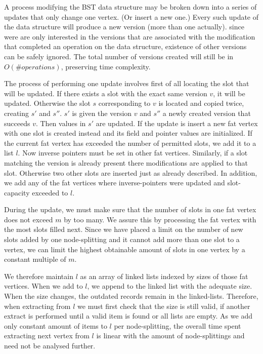 A process modifying the BST data structure may be broken down into a series of updates that only change one vertex. (Or insert a new one.)
Every such update of the data structure will produce a new version (more than one actually). since were are only interested in the versions that are associated with the modification that completed an operation on the data structure, existence of other versions can be safely ignored. The total number of versions created will still be in $O(\# operations)$, preserving time complexity.

The process of performing one update involves first of all locating the slot that will be updated. If there exists a slot with the exact same version $v$, it will be updated. Otherwise the slot $s$ corresponding to $v$ is located and copied twice, creating $s'$ and $s''$. $s'$ is given the version $v$ and $s''$ a newly created version that succeeds $v$. Then values in $s'$ are updated.
If the update is insert a new fat vertex with one slot is created instead and its field and pointer values are initialized.
If the current fat vertex has exceeded the number of permitted slots, we add it to a list $l$.
Now inverse pointers must be set in other fat vertices. Similarly, if a slot matching the version is already present there modifications are applied to that slot. Otherwise two other slots are inserted just as already described. In addition, we add any of the fat vertices where inverse-pointers were updated and slot-capacity exceeded to $l$.

During the update, we must make sure that the number of slots in one fat vertex does not exceed $m$ by too many. We assure this by processing the fat vertex with the most slots filled next. Since we have placed a limit on the number of new slots added by one node-splitting and it cannot add more than one slot to a vertex, we can limit the highest obtainable amount of slots in one vertex by a constant multiple of $m$.

We therefore maintain $l$ as an array of linked lists indexed by sizes of those fat vertices. When we add to $l$, we append to the linked list with the adequate size. When the size changes, the outdated records remain in the linked-lists. Therefore, when extracting from $l$ we must first check that the size is still valid, if another extract is performed until a valid item is found or all lists are empty. As we add only constant amount of items to $l$ per node-splitting, the overall time spent extracting next vertex from $l$ is linear with the amount of node-splittings and need not be analysed further.


